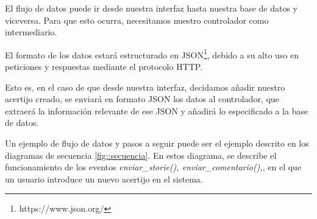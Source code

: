 El flujo de datos puede ir desde nuestra interfaz hasta nuestra base de datos y viceversa. Para que esto ocurra, necesitamos nuestro controlador como intermediario. 

El formato de los datos estará estructurado en JSON\footnote{https://www.json.org/}, debido a su alto uso en peticiones y respuestas mediante el protocolo HTTP.

Esto es, en el caso de que desde nuestra interfaz, decidamos añadir nuestro acertijo creado, se enviará en formato JSON los datos al controlador, que extraerá la información relevante de ese JSON y añadirá lo especificado a la base de datos.

Un ejemplo de flujo de datos y pasos a seguir puede ser el ejemplo descrito en los diagramas de secuencia \ref{fig::secuencia}. En estos diagrama, se describe el funcionamiento de los eventos \textit{enviar\_storie(), enviar\_comentario(),}, en el que un usuario introduce un nuevo acertijo en el sistema.

